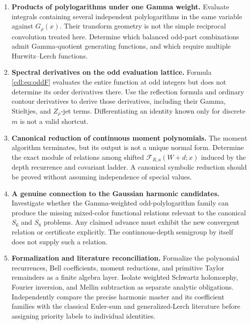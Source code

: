 \documentclass[11pt,letterpaper]{article}
\numberwithin{equation}{section}
\theoremstyle{definition}\newtheorem{definition}[theorem]{Definition}
\theoremstyle{remark}\newtheorem{remark}[theorem]{Remark}
\newcommand{\F}{\mathcal F}\newcommand{\E}{\mathcal E}
\begin{document}
\begin{enumerate}[label=Q\arabic*.]
\item \textbf{Products of polylogarithms under one Gamma weight.}
Evaluate integrals containing several independent polylogarithms in the
same variable against $G_\rho(x)$. Their transform geometry is not the
simple reciprocal convolution treated here. Determine which balanced
odd-part combinations admit Gamma-quotient generating functions, and
which require multiple Hurwitz--Lerch functions.

\item \textbf{Spectral derivatives on the odd evaluation lattice.}
Formula \eqref{cdl:eq:oddF} evaluates the entire function at odd integers
but does not determine its order derivatives there. Use the reflection
formula and ordinary contour derivatives to derive those derivatives,
including their Gamma, Stieltjes, and $Z_\rho$-jet terms. Differentiating
an identity known only for discrete $m$ is not a valid shortcut.

\item \textbf{Canonical reduction of continuous moment polynomials.}
The moment algorithm terminates, but its output is not a unique normal
form. Determine the exact module of relations among shifted
$\F_{R,a}(W+d;x)$ induced by the depth recurrence and covariant ladder.
A canonical symbolic reduction should be proved without assuming
independence of special values.

\item \textbf{A genuine connection to the Gaussian harmonic candidates.}
Investigate whether the Gamma-weighted odd-polylogarithm family can
produce the missing mixed-color functional relations relevant to the
canonical $S_6$ and $S_8$ problems. Any claimed advance must exhibit the
new convergent relation or certificate explicitly. The continuous-depth
semigroup by itself does not supply such a relation.

\item \textbf{Formalization and literature reconciliation.}
Formalize the polynomial recurrences, Bell coefficients, moment
reductions, and primitive Taylor remainders as a finite algebra layer.
Isolate weighted Schwartz holomorphy, Fourier inversion, and Mellin
subtraction as separate analytic obligations. Independently compare the
precise harmonic master and its coefficient families with the classical
Euler-sum and generalized-Lerch literature before assigning priority
labels to individual identities.
\end{enumerate}
\end{document}
